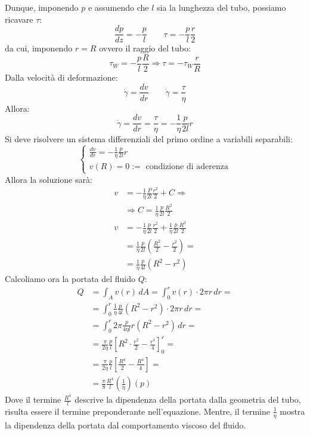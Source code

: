 Dunque, imponendo $p$ e assumendo che $l$ sia la lunghezza del tubo, possiamo ricavare $\tau$:
\begin{equation}
\frac{dp}{dz} = -\frac{p}{l} \qquad \tau = -\frac{p}{l}\frac{r}{2}
\end{equation}
da cui, imponendo $r = R$ ovvero il raggio del tubo:
\begin{equation}
\tau_W = -\frac{p}{l}\frac{R}{2} \Rightarrow \tau = -\tau_W \frac{r}{R}
\end{equation}
Dalla velocità di deformazione:
\begin{equation}
\dot{\gamma} = \frac{dv}{dr} \qquad \dot{\gamma} = \frac{\tau}{\eta}
\end{equation}
Allora:
\begin{equation}
\dot{\gamma} = \frac{dv}{dr} = \frac{\tau}{\eta} = -\frac{1}{\eta}\frac{p}{2l}r
\end{equation}
Si deve risolvere un sistema differenziali del primo ordine a variabili separabili:
\begin{equation}
\begin{cases}
\frac{dv}{dr} = -\frac{1}{\eta}\frac{p}{2l}r\\
v(R) = 0 :=\text{ condizione di aderenza}
\end{cases}
\end{equation}
Allora la soluzione sarà:
\begin{equation}
\begin{split}
v &= -\frac{1}{\eta}\frac{P}{2l}\frac{r^2}{2} + C \Rightarrow\\
&\Rightarrow C = \frac{1}{\eta}\frac{p}{2l}\frac{R^2}{2}\\
v &= -\frac{1}{\eta}\frac{p}{2l}\frac{r^2}{2} + \frac{1}{\eta}\frac{p}{2l}\frac{R^2}{2}\\
&= \frac{1}{\eta}\frac{p}{2l}\left(\frac{R^2}{2} - \frac{r^2}{2}\right)=\\
&=\frac{1}{\eta}\frac{p}{4l}\left(R^2 - r^2\right)
\end{split}
\end{equation}
Calcoliamo ora la portata del fluido $Q$:
\begin{equation}
\begin{split}
Q &= \int_A{v(r)\,dA} = \int_0^r{v(r) \cdot 2\pi r \, dr}=\\
&= \int_0^r{\frac{1}{\eta}\frac{p}{4l}\left(R^2 - r^2\right)\cdot 2\pi r \, dr} =\\
&= \int_0^r{2\pi \frac{p}{4\eta l} r (R^2 - r^2) \, dr} =\\
&= \frac{\pi}{2\eta} \frac{p}{l}\left[R^2 \cdot \frac{r^2}{2} - \frac{r^4}{4}\right]_0^r =\\
&=\frac{\pi}{2\eta} \frac{p}{l} \left[\frac{R^4}{2} - \frac{R^4}{4}\right] =\\
&= \frac{\pi}{8}\frac{R^4}{l}\left(\frac{1}{\eta}\right)(p)
\end{split}
\end{equation}
Dove il termine $\frac{R^4}{l}$ descrive la dipendenza della portata dalla geometria del tubo, risulta essere il termine preponderante nell'equazione.
Mentre, il termine $\frac{1}{\eta}$ mostra la dipendenza della portata dal comportamento viscoso del fluido.

